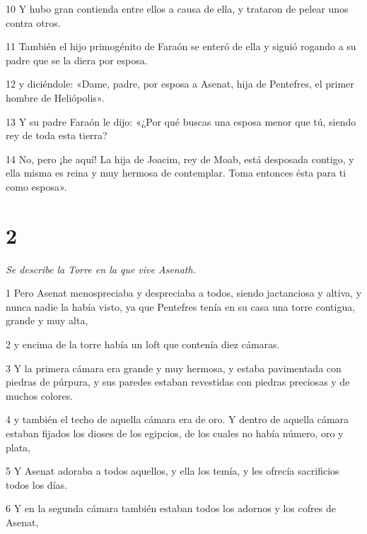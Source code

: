 \par 10 Y hubo gran contienda entre ellos a causa de ella, y trataron de pelear unos contra otros.

\par 11 También el hijo primogénito de Faraón se enteró de ella y siguió rogando a su padre que se la diera por esposa.

\par 12 y diciéndole: «Dame, padre, por esposa a Asenat, hija de Pentefres, el primer hombre de Heliópolis».

\par 13 Y su padre Faraón le dijo: «¿Por qué buscas una esposa menor que tú, siendo rey de toda esta tierra?

\par 14 No, pero ¡he aquí! La hija de Joacim, rey de Moab, está desposada contigo, y ella misma es reina y muy hermosa de contemplar. Toma entonces ésta para ti como esposa».

\chapter{2}

\par \textit{Se describe la Torre en la que vive Asenath.}

\par 1 Pero Asenat menospreciaba y despreciaba a todos, siendo jactanciosa y altiva, y nunca nadie la había visto, ya que Pentefres tenía en su casa una torre contigua, grande y muy alta,

\par 2 y encima de la torre había un loft que contenía diez cámaras.

\par 3 Y la primera cámara era grande y muy hermosa, y estaba pavimentada con piedras de púrpura, y sus paredes estaban revestidas con piedras preciosas y de muchos colores.

\par 4 y también el techo de aquella cámara era de oro. Y dentro de aquella cámara estaban fijados los dioses de los egipcios, de los cuales no había número, oro y plata,

\par 5 Y Asenat adoraba a todos aquellos, y ella los temía, y les ofrecía sacrificios todos los días.

\par 6 Y en la segunda cámara también estaban todos los adornos y los cofres de Asenat,

